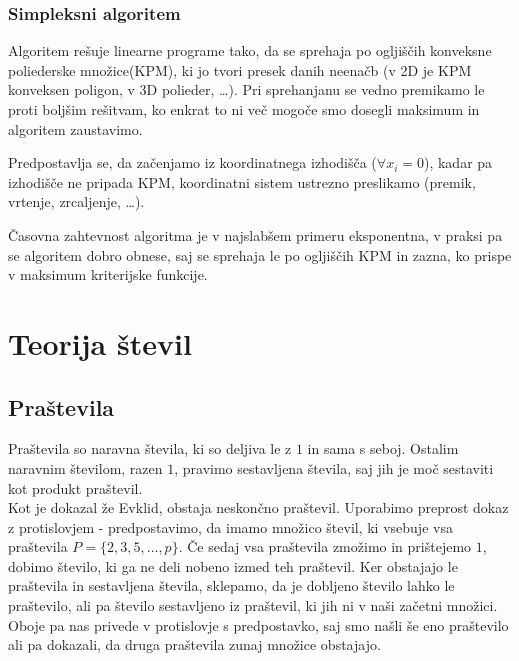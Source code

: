 \documentclass[10pt,a4paper,oneside]{book}
\begin{document}
\subsection{Simpleksni algoritem}
Algoritem rešuje linearne programe tako, da se sprehaja po ogljiščih konveksne poliederske množice(KPM), ki jo tvori presek danih neenačb (v 2D je KPM konveksen poligon, v 3D polieder, \dots). Pri sprehanjanu se vedno premikamo le proti boljšim rešitvam, ko enkrat to ni več mogoče smo dosegli maksimum in algoritem zaustavimo.

Predpostavlja se, da začenjamo iz koordinatnega izhodišča ($\forall x_i = 0$), kadar pa izhodišče ne pripada KPM, koordinatni sistem ustrezno preslikamo (premik, vrtenje, zrcaljenje, \dots).

Časovna zahtevnost algoritma je v najslabšem primeru eksponentna, v praksi pa se algoritem dobro obnese, saj se sprehaja le po ogljiščih KPM in zazna, ko prispe v maksimum kriterijske funkcije.

\chapter{Teorija števil}

\section{Praštevila}
Praštevila so naravna števila, ki so deljiva le z $1$ in sama s seboj. Ostalim naravnim številom, razen $1$, pravimo sestavljena števila, saj jih je moč sestaviti kot produkt praštevil.\\

Kot je dokazal že Evklid\cite{elementi}, obstaja neskončno praštevil. Uporabimo preprost dokaz z protislovjem - predpostavimo, da imamo množico števil, ki vsebuje vsa praštevila $P = \{2,3,5,\dots,p\}$. Če sedaj vsa praštevila zmožimo in prištejemo $1$, dobimo število, ki ga ne deli nobeno izmed teh praštevil. Ker obstajajo le praštevila in sestavljena števila, sklepamo, da je dobljeno število lahko le praštevilo, ali pa število sestavljeno iz praštevil, ki jih ni v naši začetni množici. Oboje pa nas privede v protislovje s predpostavko, saj smo našli še eno praštevilo ali pa dokazali, da druga praštevila zunaj množice obstajajo.\\
\end{document}
